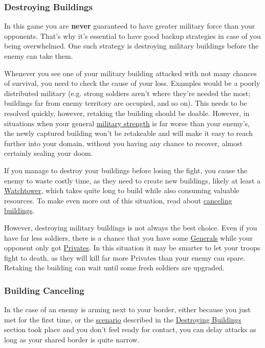 \documentclass[12pt]{article}
\begin{document}
\subsubsection{Destroying Buildings}
\label{sec:destroyingbuildings}

In this game you are \textbf{never} guaranteed to have greater military force than your opponents. That's why it's essential to have good backup strategies in case of you being overwhelmed. One such strategy is destroying military buildings before the enemy can take them.

Whenever you see one of your military building attacked with not many chances of survival, you need to check the cause of your loss. Examples would be a poorly distributed military (e.g. strong soldiers aren't where they're needed the most; buildings far from enemy territory are occupied, and so on). This needs to be resolved quickly, however, retaking the building should be doable. However, in situations when your general \hyperref[sec:statisticsmilitary]{military strength} is far worse than your enemy's, the newly captured building won't be retakeable and will make it easy to reach further into your domain, without you having any chance to recover, almost certainly sealing your doom.

\label{wastingenemyresourcesbydestroyingbuildings}
If you manage to destroy your buildings before losing the fight, you cause the enemy to waste costly time, as they need to create new buildings, likely at least a \hyperref[sec:watchtower]{Watchtower}, which takes quite long to build while also consuming valuable resources. To make even more out of this situation, read about \hyperref[sec:buildingcanceling]{canceling buildings}.

However, destroying military buildings is not always the best choice. Even if you have far less soldiers, there is a chance that you have some \hyperref[sec:general]{Generals} while your opponent only got \hyperref[sec:private]{Privates}. In this situation it may be smarter to let your troops fight to death, as they will kill far more Privates than your enemy can spare. Retaking the building can wait until some fresh soldiers are upgraded.

\subsubsection{Building Canceling}
\label{sec:buildingcanceling}

In the case of an enemy is arming next to your border, either because you just met for the first time, or the \hyperref[wastingenemyresourcesbydestroyingbuildings]{scenario} described in the \hyperref[sec:destroyingbuildings]{Destroying Buildings} section took place and you don't feel ready for contact, you can delay attacks as long as your shared border is quite narrow.
\end{document}
